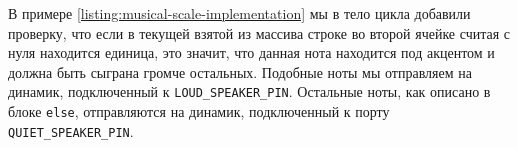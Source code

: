 \documentclass[../sparc.tex]{subfiles}
\begin{document}
В примере \ref{listing:musical-scale-implementation} мы в тело цикла добавили
проверку, что если в текущей взятой из массива строке во второй ячейке считая с
нуля находится единица, это значит, что данная нота находится под акцентом и
должна быть сыграна громче остальных.  Подобные ноты мы отправляем на динамик,
подключенный к \texttt{LOUD\_SPEAKER\_PIN}.  Остальные ноты, как описано в блоке
\texttt{else}, отправляются на динамик, подключенный к порту
\texttt{QUIET\_SPEAKER\_PIN}.
\end{document}

